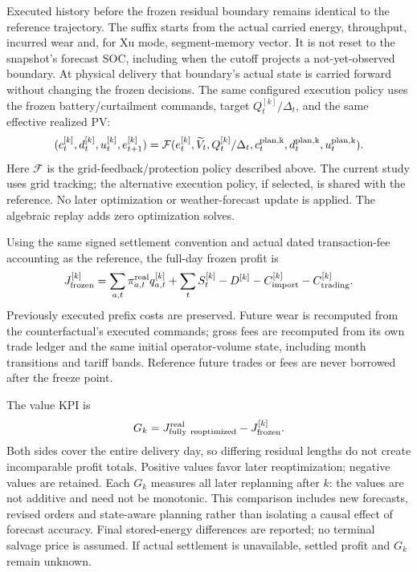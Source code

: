 \documentclass[11pt,a4paper]{article}
\begin{document}
Executed history before the frozen residual boundary remains identical to the
reference trajectory. The suffix starts from the actual carried energy,
throughput, incurred wear and, for Xu mode, segment-memory vector. It is not
reset to the snapshot's forecast SOC, including when the cutoff projects a
not-yet-observed boundary. At physical delivery that boundary's actual state is
carried forward without changing the frozen decisions.
The same configured execution policy uses the frozen battery/curtailment
commands, target $Q^{[k]}_t/\Delta_t$, and the same effective realized PV:
\begin{equation}
 (c_t^{[k]},d_t^{[k]},u_t^{[k]},e_{t+1}^{[k]})
 =\mathcal F(e_t^{[k]},\widetilde V_t,Q_t^{[k]}/\Delta_t,
             c_t^{\rm plan,k},d_t^{\rm plan,k},u_t^{\rm plan,k}).
\end{equation}
Here $\mathcal F$ is the grid-feedback/protection policy described above. The
current study uses grid tracking; the alternative execution policy, if selected,
is shared with the reference. No later optimization or weather-forecast update
is applied. The algebraic replay adds zero optimization solves.

Using the same signed settlement convention and actual dated transaction-fee
accounting as the reference, the full-day frozen profit is
\begin{equation}
 J_{\rm frozen}^{[k]}=
 \sum_{a,t}\pi_{a,t}^{\rm real}q_{a,t}^{[k]}
 +\sum_t S_t^{[k]}-D^{[k]}-C_{\rm import}^{[k]}
 -C_{\rm trading}^{[k]}.
\end{equation}
Previously executed prefix costs are preserved. Future wear is recomputed from
the counterfactual's executed commands; gross fees are recomputed from its own
trade ledger and the same initial operator-volume state, including month
transitions and tariff bands. Reference future trades or fees are never borrowed
after the freeze point.

The value KPI is
\begin{equation}
 G_k=J_{\rm fully\ reoptimized}^{\rm real}-J_{\rm frozen}^{[k]}.
\end{equation}
Both sides cover the entire delivery day, so differing residual lengths do not
create incomparable profit totals. Positive values favor later reoptimization;
negative values are retained. Each $G_k$ measures all later replanning after
$k$: the values are not additive and need not be monotonic. This comparison
includes new forecasts, revised orders and state-aware planning rather than
isolating a causal effect of forecast accuracy. Final stored-energy differences
are reported; no terminal salvage price is assumed. If actual settlement is
unavailable, settled profit and $G_k$ remain unknown.
\end{document}
